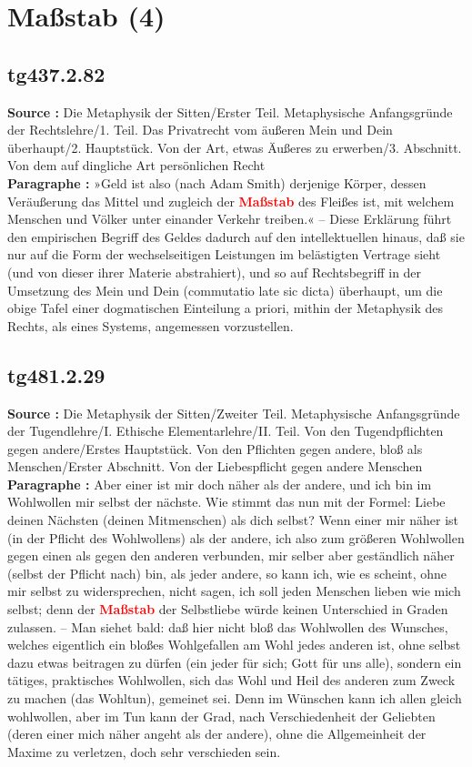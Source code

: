 \documentclass[a4paper,12pt,twoside]{book}
\newcommand{\match}[1]{\textcolor{red}{\textbf{#1}}}
\newcommand{\unnumberedsection}[1]{
	\section*{#1}
	\addcontentsline{toc}{section}{#1}
	\markright{#1}
}
\begin{document}
	\unnumberedsection{Maßstab (4)} 
	\subsection*{tg437.2.82} 
	\textbf{Source : }Die Metaphysik der Sitten/Erster Teil. Metaphysische Anfangsgründe der Rechtslehre/1. Teil. Das Privatrecht vom äußeren Mein und Dein überhaupt/2. Hauptstück. Von der Art, etwas Äußeres zu erwerben/3. Abschnitt. Von dem auf dingliche Art persönlichen Recht\\  
	
	\textbf{Paragraphe : }»Geld ist also (nach Adam Smith) derjenige Körper, dessen Veräußerung das Mittel und zugleich der \match{Maßstab} des Fleißes ist, mit welchem Menschen und Völker unter einander Verkehr treiben.« – Diese Erklärung führt den empirischen Begriff des Geldes dadurch auf den intellektuellen hinaus, daß sie nur auf die Form der wechselseitigen Leistungen  im belästigten Vertrage sieht (und von dieser ihrer Materie abstrahiert), und so auf Rechtsbegriff in der Umsetzung des Mein und Dein (commutatio late sic dicta) überhaupt, um die obige Tafel einer dogmatischen Einteilung a priori, mithin der Metaphysik des Rechts, als eines Systems, angemessen vorzustellen. 
	
	\subsection*{tg481.2.29} 
	\textbf{Source : }Die Metaphysik der Sitten/Zweiter Teil. Metaphysische Anfangsgründe der Tugendlehre/I. Ethische Elementarlehre/II. Teil. Von den Tugendpflichten gegen andere/Erstes Hauptstück. Von den Pflichten gegen andere, bloß als Menschen/Erster Abschnitt. Von der Liebespflicht gegen andere Menschen\\  
	
	\textbf{Paragraphe : }Aber einer ist mir doch näher als der andere, und ich bin im Wohlwollen mir selbst der nächste. Wie stimmt das nun mit der Formel: Liebe deinen Nächsten (deinen Mitmenschen) als dich selbst? Wenn einer mir näher ist (in der Pflicht des Wohlwollens) als der andere, ich also zum größeren Wohlwollen gegen einen als gegen den anderen verbunden, mir selber aber geständlich näher (selbst der Pflicht nach) bin, als jeder andere, so kann ich, wie es scheint, ohne mir selbst zu widersprechen, nicht sagen, ich soll jeden Menschen lieben wie mich selbst; denn der \match{Maßstab} der Selbstliebe würde keinen Unterschied in Graden zulassen. – Man siehet bald: daß hier nicht bloß das Wohlwollen des Wunsches, welches eigentlich ein bloßes Wohlgefallen am Wohl jedes anderen ist, ohne selbst dazu etwas beitragen zu dürfen (ein jeder für sich; Gott für uns alle), sondern ein tätiges, praktisches Wohlwollen, sich das Wohl und Heil des anderen zum Zweck zu machen (das Wohltun), gemeinet sei. Denn im Wünschen kann ich allen gleich wohlwollen, aber im Tun kann der Grad, nach Verschiedenheit der Geliebten (deren einer mich näher angeht als der andere), ohne die Allgemeinheit der Maxime zu verletzen, doch sehr verschieden sein. 
	
\end{document}
